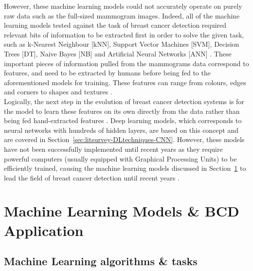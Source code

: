 However, these machine learning models could not accurately operate on purely raw data such as the full-sized mammogram images. Indeed, all of the machine learning models tested against the task of breast cancer detection required relevant bits of information to be extracted first in order to solve the given task, such as k-Nearest Neighbour [kNN], Support Vector Machines [SVM], Decision Trees [DT], Naive Bayes [NB] and Artificial Neural Networks [ANN] \cite{Yue2018} \cite{Asri2016}. These important pieces of information pulled from the mammograms data correspond to features, and need to be extracted by humans before being fed to the aforementioned models for training. These features can range from colours, edges and corners to shapes and textures \cite{Geron2019}.\\

Logically, the next step in the evolution of breast cancer detection systems is for the model to learn these features on its own directly from the data rather than being fed hand-extracted features \cite{Yala2019}. Deep learning models, which corresponds to neural networks with hundreds of hidden layers, are based on this concept and are covered in Section~\ref{sec:litsurvey-DLtechniques-CNN}. However, these models have not been successfully implemented until recent years as they require powerful computers (usually equipped with Graphical Processing Units) to be efficiently trained, causing the machine learning models discussed in Section~\ref{sec:litreview-MLmodel-BCDapplications} to lead the field of breast cancer detection until recent years \cite{Litjens2017}.



\section{Machine Learning Models \& BCD Application}
\label{sec:litreview-MLmodel-BCDapplications}

\subsection{Machine Learning algorithms \& tasks}

